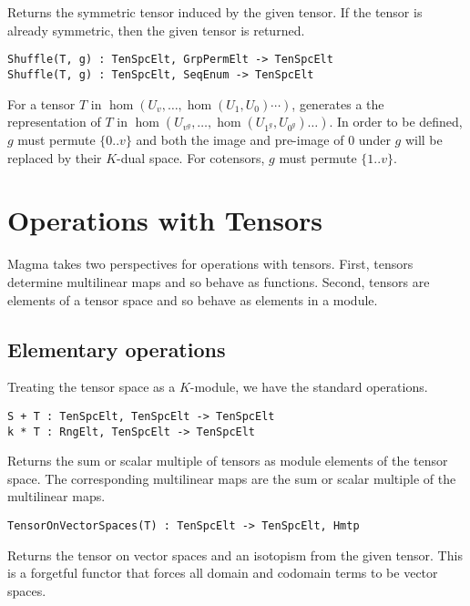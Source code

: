Returns the symmetric tensor induced by the given tensor. If the tensor is 
already symmetric, then the given tensor is returned.

\color{blue}
{\small \begin{verbatim}
Shuffle(T, g) : TenSpcElt, GrpPermElt -> TenSpcElt
Shuffle(T, g) : TenSpcElt, SeqEnum -> TenSpcElt
\end{verbatim} }
\color{black}

For a tensor $T$ in $\hom(U_v,\dots,\hom(U_1,U_0)\cdots)$, 
generates a the representation of $T$ in $\hom(U_{v^g},\dots,\hom(U_{1^g},U_{0^g})\dots)$.
In order to be defined, $g$ must permute $\{0..v\}$ and both the image and 
pre-image of $0$ under $g$ will be replaced by their $K$-dual space.
For cotensors, $g$ must permute $\{1..v\}$.


\section{Operations with Tensors}

Magma takes two perspectives for operations with tensors. 
First, tensors determine multilinear maps and so behave as
functions.  Second, tensors are elements of a tensor space and 
so behave as elements in a module.  

\subsection{Elementary operations}
Treating the tensor space as a $K$-module, we have the standard operations.

\color{blue}
\index{$+$}
{\small \begin{verbatim}
S + T : TenSpcElt, TenSpcElt -> TenSpcElt
k * T : RngElt, TenSpcElt -> TenSpcElt
\end{verbatim} }
\color{black}

Returns the sum or scalar multiple of tensors as module elements of the tensor 
space. The corresponding multilinear maps are the sum or scalar multiple of the 
multilinear maps.

\color{blue}
{\small \begin{verbatim}
TensorOnVectorSpaces(T) : TenSpcElt -> TenSpcElt, Hmtp
\end{verbatim} }
\color{black}

Returns the tensor on vector spaces and an isotopism from the given tensor. 
This is a forgetful functor that forces all domain and codomain terms to be 
vector spaces.

